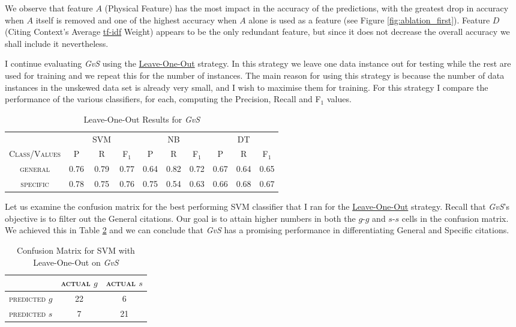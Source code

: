 We observe that feature $A$ (Physical Feature) has the most impact in the accuracy of the predictions, with the greatest drop in accuracy when $A$ itself is removed and one of the highest accuracy when $A$ alone is used as a feature (see Figure \ref{fig:ablation_first}). Feature $D$ (Citing Context's Average \url{tf-idf} Weight) appears to be the only redundant feature, but since it does not decrease the overall accuracy we shall include it nevertheless.

I continue evaluating {\it GvS} using the \url{Leave-One-Out} strategy. In this strategy we leave one data instance out for testing while the rest are used for training and we repeat this for the number of instances. The main reason for using this strategy is because the number of data instances in the unskewed data set is already very small, and I wish to maximise them for training. For this strategy I compare the performance of the various classifiers, for each, computing the Precision, Recall and F$_1$ values.

\begin{table}[h]
	\center
	\begin{tabular}{ c | c  c  c | c c c | c c c}
		& & SVM & & & NB & & & DT \\
		\textsc{Class/Values} & \textsc{P} & \textsc{R} & \textsc{F$_1$} & \textsc{P} & \textsc{R} & \textsc{F$_1$} & \textsc{P} & \textsc{R} & \textsc{F$_1$} \\
		\hline
		\textsc{general} 			& 0.76  &    0.79   &   0.77 & 0.64   &   0.82   &   0.72 & 0.67  &    0.64  &    0.65 \\
		\textsc{specific} 			& 0.78  &    0.75   &   0.76 & 0.75   &   0.54   &   0.63 & 0.66  &    0.68  &    0.67 \\
	\end{tabular}
	\caption{Leave-One-Out Results for {\it GvS}}
	\label{tab:firsttieresults}
\end{table}

Let us examine the confusion matrix for the best performing SVM classifier that I ran for the \url{Leave-One-Out} strategy. Recall that {\it GvS}'s objective is to filter out the General citations. Our goal is to attain higher numbers in both the $g$-$g$ and $s$-$s$ cells in the confusion matrix. We achieved this in Table \ref{tab:firstsvmconfusionmatrix} and we can conclude that {\it GvS} has a promising performance in differentiating General and Specific citations.

\begin{table}[h]
	\center
	\begin{tabular}{ c | c  c }
		 & \textsc{actual $g$} & \textsc{actual $s$} \\
		\hline
		\textsc{predicted $g$} 	& 22 & 6 \\
		\textsc{predicted $s$}		& 7 & 21
	\end{tabular}
	\caption{Confusion Matrix for SVM with Leave-One-Out on {\it GvS}}
	\label{tab:firstsvmconfusionmatrix}
\end{table}

